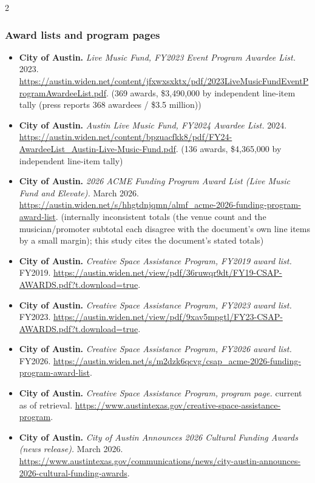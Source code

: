 {\begin{multicols}{2}
\subsubsection*{Award lists and program pages}
\begin{itemize}[itemsep=0pt,topsep=1pt,parsep=0pt,partopsep=0pt,leftmargin=1em]
\item \textbf{City of Austin.} \textit{Live Music Fund, FY2023 Event Program Awardee List.} 2023. \url{https://austin.widen.net/content/jfxwxsxktx/pdf/2023LiveMusicFundEventProgramAwardeeList.pdf}. {\color{ammuted}(369 awards, \$3,490,000 by independent line-item tally (press reports 368 awardees / \$3.5 million))}
\item \textbf{City of Austin.} \textit{Austin Live Music Fund, FY2024 Awardee List.} 2024. \url{https://austin.widen.net/content/bpzuacfkk8/pdf/FY24-AwardeeList_Austin-Live-Music-Fund.pdf}. {\color{ammuted}(136 awards, \$4,365,000 by independent line-item tally)}
\item \textbf{City of Austin.} \textit{2026 ACME Funding Program Award List (Live Music Fund and Elevate).} March 2026. \url{https://austin.widen.net/s/hhgtdnjqmn/almf_acme-2026-funding-program-award-list}. {\color{ammuted}(internally inconsistent totals (the venue count and the musician/promoter subtotal each disagree with the document’s own line items by a small margin); this study cites the document’s stated totals)}
\item \textbf{City of Austin.} \textit{Creative Space Assistance Program, FY2019 award list.} FY2019. \url{https://austin.widen.net/view/pdf/36ruwqr9dt/FY19-CSAP-AWARDS.pdf?t.download=true}.
\item \textbf{City of Austin.} \textit{Creative Space Assistance Program, FY2023 award list.} FY2023. \url{https://austin.widen.net/view/pdf/9xav5mpgtl/FY23-CSAP-AWARDS.pdf?t.download=true}.
\item \textbf{City of Austin.} \textit{Creative Space Assistance Program, FY2026 award list.} FY2026. \url{https://austin.widen.net/s/m2dzk6qcvg/csap_acme-2026-funding-program-award-list}.
\item \textbf{City of Austin.} \textit{Creative Space Assistance Program, program page.} current as of retrieval. \url{https://www.austintexas.gov/creative-space-assistance-program}.
\item \textbf{City of Austin.} \textit{City of Austin Announces 2026 Cultural Funding Awards (news release).} March 2026. \url{https://www.austintexas.gov/communications/news/city-austin-announces-2026-cultural-funding-awards}.

\end{itemize}
\end{multicols}}
